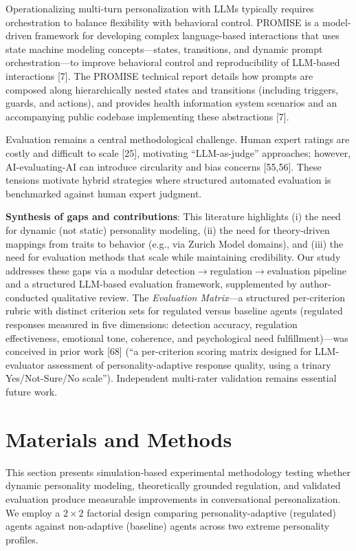 \documentclass[apajournal,article,submit,moreauthors]{Definitions/mdpi}
\begin{document}
Operationalizing multi-turn personalization with LLMs typically requires orchestration to balance flexibility with behavioral control. PROMISE is a model-driven framework for developing complex language-based interactions that uses state machine modeling concepts---states, transitions, and dynamic prompt orchestration---to improve behavioral control and reproducibility of LLM-based interactions {[}7{]}. The PROMISE technical report details how prompts are composed along hierarchically nested states and transitions (including triggers, guards, and actions), and provides health information system scenarios and an accompanying public codebase implementing these abstractions {[}7{]}.

Evaluation remains a central methodological challenge. Human expert ratings are costly and difficult to scale {[}25{]}, motivating ``LLM-as-judge'' approaches; however, AI-evaluating-AI can introduce circularity and bias concerns {[}55,56{]}. These tensions motivate hybrid strategies where structured automated evaluation is benchmarked against human expert judgment.

\textbf{Synthesis of gaps and contributions}: This literature highlights (i) the need for dynamic (not static) personality modeling, (ii) the need for theory-driven mappings from traits to behavior (e.g., via Zurich Model domains), and (iii) the need for evaluation methods that scale while maintaining credibility. Our study addresses these gaps via a modular detection$\rightarrow$regulation$\rightarrow$evaluation pipeline and a structured LLM-based evaluation framework, supplemented by author-conducted qualitative review. The \emph{Evaluation Matrix}---a structured per-criterion rubric with distinct criterion sets for regulated versus baseline agents (regulated responses measured in five dimensions: detection accuracy, regulation effectiveness, emotional tone, coherence, and psychological need fulfillment)---was conceived in prior work {[}68{]} (``a per-criterion scoring matrix designed for LLM-evaluator assessment of personality-adaptive response quality, using a trinary Yes/Not-Sure/No scale''). Independent multi-rater validation remains essential future work.

\section{Materials and Methods}\label{materials-and-methods}

This section presents simulation-based experimental methodology testing whether dynamic personality modeling, theoretically grounded regulation, and validated evaluation produce measurable improvements in conversational personalization. We employ a $2 \times 2$ factorial design comparing personality-adaptive (regulated) agents against non-adaptive (baseline) agents across two extreme personality profiles.
\end{document}
